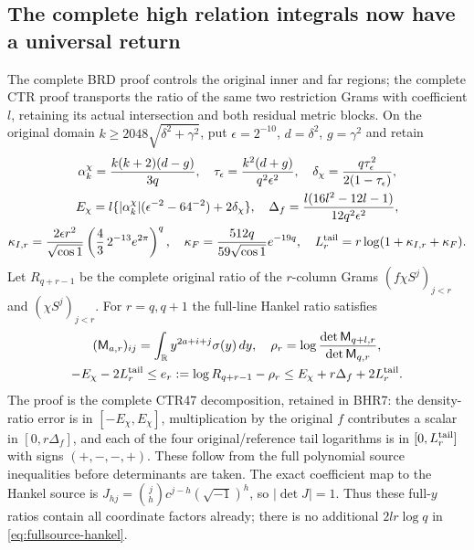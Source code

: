 \documentclass[11pt,a4paper]{article}
\newcommand{\R}{\mathbb R}
\begin{document}
\subsection{The complete high relation integrals now have a universal return}
The complete BRD proof controls the original inner and far regions;
the complete CTR proof transports the ratio of the same two
restriction Grams with coefficient $l$, retaining its actual
intersection and both residual metric blocks. On the original
domain $k\geq2048\sqrt{\delta^2+\gamma^2}$, put
$\epsilon=2^{-10}$, $d=\delta^2$, $g=\gamma^2$ and retain
\begin{equation}
\begin{gathered}
 \alpha_k^\chi=\frac{k(k+2)(d-g)}{3q},\quad
 \tau_\epsilon=\frac{k^2(d+g)}{q^2\epsilon^2},\quad
 \delta_\chi=\frac{q\tau_\epsilon^2}{2(1-\tau_\epsilon)},\\
 E_\chi=l\{|\alpha_k^\chi|(\epsilon^{-2}-64^{-2})+2\delta_\chi\},
 \quad\Delta_f=\frac{l(16l^2-12l-1)}{12q^2\epsilon^2},\\
 \kappa_{I,r}=\frac{2\epsilon r^2}{\sqrt{\cos1}}
       \left(\frac43\,2^{-13}e^{2\pi}\right)^q,\quad
 \kappa_F=\frac{512q}{59\sqrt{\cos1}}e^{-19q},\quad
 L_r^{\rm tail}=r\log(1+\kappa_{I,r}+\kappa_F).
\end{gathered}\label{eq:fullsource-constants}
\end{equation}
Let $R_{q+r-1}$ be the complete original ratio of the
$r$-column Grams $(f\chi S^j)_{j<r}$ and $(\chi S^j)_{j<r}$.
For $r=q,q+1$ the full-line Hankel ratio satisfies
\begin{equation}
\begin{gathered}
 (\mathsf M_{a,r})_{ij}=\int_{\R}y^{2a+i+j}\sigma(y)\,dy,
 \quad\rho_r=\log\frac{\det\mathsf M_{q+l,r}}{\det\mathsf M_{q,r}},\\
 -E_\chi-2L_r^{\rm tail}\leq
 e_r:=\log R_{q+r-1}-\rho_r
 \leq E_\chi+r\Delta_f+2L_r^{\rm tail}.
\end{gathered}\label{eq:fullsource-hankel}
\end{equation}
The proof is the complete CTR47 decomposition, retained in BHR7:
the density-ratio error is in $[-E_\chi,E_\chi]$, multiplication
by the original $f$ contributes a scalar in $[0,r\Delta_f]$,
and each of the four original/reference tail logarithms is in
$[0,L_r^{\rm tail}]$ with signs $(+,-,-,+)$. These follow
from the full polynomial source inequalities before determinants
are taken. The exact coefficient map to the Hankel source is
$J_{hj}=\binom jh c^{j-h}(\sqrt{-1})^h$, so $|\det J|=1$.
Thus these full-$y$ ratios contain all coordinate factors already;
there is no additional $2lr\log q$ in \eqref{eq:fullsource-hankel}.
\end{document}
